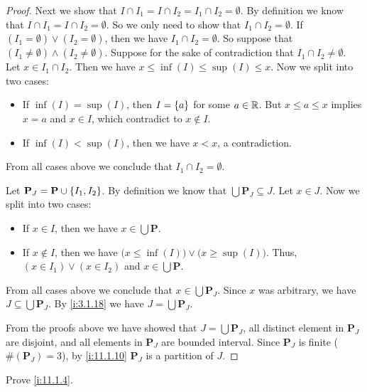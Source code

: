\begin{proof}
  Next we show that \(I \cap I_1 = I \cap I_2 = I_1 \cap I_2 = \emptyset\).
  By definition we know that \(I \cap I_1 = I \cap I_2 = \emptyset\).
  So we only need to show that \(I_1 \cap I_2 = \emptyset\).
  If \((I_1 = \emptyset) \lor (I_2 = \emptyset)\), then we have \(I_1 \cap I_2 = \emptyset\).
  So suppose that \((I_1 \neq \emptyset) \land (I_2 \neq \emptyset)\).
  Suppose for the sake of contradiction that \(I_1 \cap I_2 \neq \emptyset\).
  Let \(x \in I_1 \cap I_2\).
  Then we have \(x \leq \inf(I) \leq \sup(I) \leq x\).
  Now we split into two cases:
  \begin{itemize}
    \item If \(\inf(I) = \sup(I)\), then \(I = \left\lbrace a\right\rbrace\) for some \(a \in \mathbb{R}\).
          But \(x \leq a \leq x\) implies \(x = a\) and \(x \in I\), which contradict to \(x \notin I\).
    \item If \(\inf(I) < \sup(I)\), then we have \(x < x\), a contradiction.
  \end{itemize}
  From all cases above we conclude that \(I_1 \cap I_2 = \emptyset\).

  Let \(\mathbf{P}_J = \mathbf{P} \cup \left\lbrace I_1, I_2\right\rbrace\).
  By definition we know that \(\bigcup \mathbf{P}_J \subseteq J\).
  Let \(x \in J\).
  Now we split into two cases:
  \begin{itemize}
    \item If \(x \in I\), then we have \(x \in \bigcup \mathbf{P}\).
    \item If \(x \notin I\), then we have \(\big(x \leq \inf(I)\big) \lor \big(x \geq \sup(I)\big)\).
          Thus, \((x \in I_1) \lor (x \in I_2)\) and \(x \in \bigcup \mathbf{P}\).
  \end{itemize}
  From all cases above we conclude that \(x \in \bigcup \mathbf{P}_J\).
  Since \(x\) was arbitrary, we have \(J \subseteq \bigcup \mathbf{P}_J\).
  By \cref{i:3.1.18} we have \(J = \bigcup \mathbf{P}_J\).

  From the proofs above we have showed that \(J = \bigcup \mathbf{P}_J\), all distinct element in \(\mathbf{P}_J\) are disjoint, and all elements in \(\mathbf{P}_J\) are bounded interval.
  Since \(\mathbf{P}_J\) is finite (\(\#(\mathbf{P}_J) = 3\)), by \cref{i:11.1.10} \(\mathbf{P}_J\) is a partition of \(J\).
\end{proof}

\exercisesection

\begin{ex}\label{i:ex:11.1.1}
  Prove \cref{i:11.1.4}.
\end{ex}

